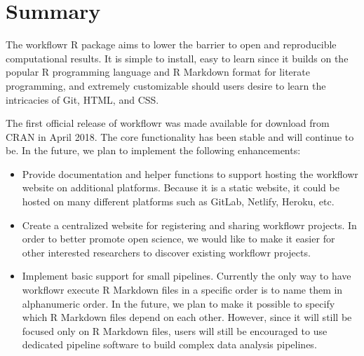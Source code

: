 \documentclass[9pt,a4paper]{extarticle}
\begin{document}
\section*{Summary}

The workflowr R package aims to lower the barrier to open and
reproducible computational results. It is simple to install, easy to
learn since it builds on the popular R programming language and R
Markdown format for literate programming, and extremely customizable
should users desire to learn the intricacies of Git, HTML, and CSS.

The first official release of workflowr was made available for download
from CRAN in April 2018. The core functionality has been stable and will
continue to be. In the future, we plan to implement the following
enhancements:

\begin{itemize}

\item Provide documentation and helper functions to support hosting the
workflowr website on additional platforms. Because it is a static
website, it could be hosted on many different platforms such as GitLab,
Netlify, Heroku, etc.

\item Create a centralized website for registering and sharing workflowr
projects. In order to better promote open science, we would like to make
it easier for other interested researchers to discover existing
workflowr projects.

\item Implement basic support for small pipelines. Currently the only
way to have workflowr execute R Markdown files in a specific order is to
name them in alphanumeric order. In the future, we plan to make it
possible to specify which R Markdown files depend on each other.
However, since it will still be focused only on R Markdown files, users
will still be encouraged to use dedicated pipeline software to build
complex data analysis pipelines.

\end{itemize}
\end{document}
